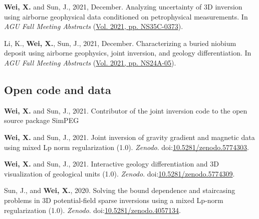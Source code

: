 \documentclass[11pt, a4paper]{article}
\newcommand{\LastName}{Wei}
\newcommand{\Initials}{X}
\newcommand{\Wei}{\textbf{\LastName, \Initials.}}  %
\newcommand{\WeiSun}{\textbf{\LastName, \Initials.} and Sun, J.}  %
\newcommand{\DOI}[1]{doi:\href{https://doi.org/#1}{#1}}
\begin{document}
\begin{etaremune}
	\item
	\WeiSun, 2021, December. Analyzing uncertainty of 3D inversion using airborne geophysical data conditioned on petrophysical measurements. In \emph{AGU Fall Meeting Abstracts} (\href{https://ui.adsabs.harvard.edu/abs/2021AGUFMNS35C0373W/abstract}{Vol. 2021, pp. NS35C-0373}).

	\item
	Li, K., \Wei, Sun, J., 2021, December. Characterizing a buried niobium deposit using airborne geophysics, joint inversion, and geology differentiation. In \emph{AGU Fall Meeting Abstracts} (\href{https://ui.adsabs.harvard.edu/abs/2021AGUFMNS24A..05L/abstract}{Vol. 2021, pp. NS24A-05}).

\end{etaremune}


\subsection*{Open code and data}
\begin{etaremune}
	\item
	\WeiSun, 2021. Contributor of the joint inversion code to the open source package SimPEG

	\item
	\WeiSun, 2021. Joint inversion of gravity gradient and magnetic data using mixed Lp norm regularization (1.0). \emph{Zenodo}. \DOI{10.5281/zenodo.5774303}.

	\item
	\WeiSun, 2021. Interactive geology differentiation and 3D visualization of geological units (1.0). \emph{Zenodo}. \DOI{10.5281/zenodo.5774309}.

	\item
	Sun, J., and \Wei, 2020. Solving the bound dependence and staircasing problems in 3D potential-field sparse inversions using a mixed Lp-norm regularization (1.0). \emph{Zenodo}. \DOI{10.5281/zenodo.4057134}.

\end{etaremune}


\end{document}
